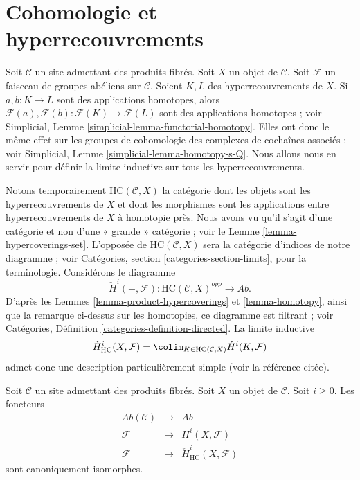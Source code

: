 \section{Cohomologie et hyperrecouvrements}
\label{section-cohomology}

\noindent
Soit $\mathcal{C}$ un site admettant des produits fibrés.
Soit $X$ un objet de $\mathcal{C}$.
Soit $\mathcal{F}$ un faisceau de groupes abéliens sur $\mathcal{C}$.
Soient $K, L$ des hyperrecouvrements de $X$.
Si $a, b : K \to L$ sont des applications homotopes,
alors $\mathcal{F}(a), \mathcal{F}(b) : \mathcal{F}(K) \to \mathcal{F}(L)$
sont des applications homotopes ; voir
Simplicial, Lemme \ref{simplicial-lemma-functorial-homotopy}.
Elles ont donc le même effet sur les groupes de cohomologie des complexes
de cochaînes associés ; voir
Simplicial, Lemme \ref{simplicial-lemma-homotopy-s-Q}.
Nous allons nous en servir pour définir la limite inductive sur tous les
hyperrecouvrements.

\medskip\noindent
Notons temporairement $\text{HC}(\mathcal{C}, X)$
la catégorie dont les objets sont les hyperrecouvrements de $X$
et dont les morphismes sont les applications entre hyperrecouvrements de $X$
à homotopie près. Nous avons vu qu'il s'agit
d'une catégorie et non d'une « grande » catégorie ;
voir le Lemme \ref{lemma-hypercoverings-set}.
L'opposée de $\text{HC}(\mathcal{C}, X)$
sera la catégorie d'indices de notre diagramme ; voir
Catégories, section \ref{categories-section-limits}, pour la terminologie.
Considérons le diagramme
$$
\check{H}^i(-, \mathcal{F}) :
\text{HC}(\mathcal{C}, X)^{opp}
\longrightarrow
\textit{Ab}.
$$
D'après les Lemmes \ref{lemma-product-hypercoverings} et \ref{lemma-homotopy},
ainsi que la remarque ci-dessus sur les homotopies, ce diagramme est filtrant ; voir
Catégories, Définition \ref{categories-definition-directed}.
La limite inductive
$$
\check{H}^i_{\text{HC}}(X, \mathcal{F}) =
\colim_{K \in \text{HC}(\mathcal{C}, X)} \check{H}^i(K, \mathcal{F})
$$
admet donc une description particulièrement simple (voir la référence citée).

\begin{theorem}
\label{theorem-cohomology-hypercoverings}
Soit $\mathcal{C}$ un site admettant des produits fibrés.
Soit $X$ un objet de $\mathcal{C}$. Soit $i \geq 0$.
Les foncteurs
\begin{eqnarray*}
\textit{Ab}(\mathcal{C}) & \longrightarrow & \textit{Ab} \\
\mathcal{F} & \longmapsto & H^i(X, \mathcal{F}) \\
\mathcal{F} & \longmapsto & \check{H}^i_{\text{HC}}(X, \mathcal{F})
\end{eqnarray*}
sont canoniquement isomorphes.
\end{theorem}


